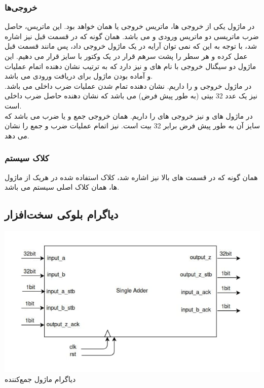 \documentclass[12pt,titlepage,a4page , tikz , multi,table , svgnames,xcdraw]{article}
\begin{document}
\subsubsection{خروجی‌ها}
در ماژول 
 یکی از خروجی ها، ماتریس خروجی یا همان 
 خواهد بود. این ماتریس، حاصل ضرب ماتریسی دو ماتریس ورودی 
 و 
 می باشد. همان گونه که در قسمت قبل نیز اشاره شد، با توجه به این که نمی توان آرایه در یک ماژول خروجی داد، پس مانند قسمت قبل عمل کرده و هر سطر را پشت سرهم قرار در یک وکتور با سایز 
 قرار می دهیم. این ماژول دو سیگنال خروجی با نام های 
  و 
 نیز دارد که به ترتیب نشان دهنده اتمام عملیات و آماده بودن ماژول برای دریافت ورودی می باشد. \\
	در ماژول 
     خروجی 
     و 
      را داریم. 
      نشان دهنده تمام شدن عملیات ضرب داخلی می باشد. 
      نیز یک عدد 32 بیتی (به طور پیش فرض) می باشد که نشان دهنده حاصل ضرب داخلی است. \\ 
	در ماژول های  
     و 
     نیز خروجی های 
     را داریم. 
     همان خروجی جمع و یا ضرب می باشد که سایز آن به طور پیش فرض برابر 32 بیت است. 
     نیز اتمام عملیات ضرب و جمع را نشان می دهد.

\subsubsection{کلاک سیستم}
	همان گونه که در قسمت های بالا نیز اشاره شد، کلاک استفاده شده در هریک از ماژول ها، همان کلاک اصلی سیستم می باشد. 
	





\subsection{دیاگرام بلوکی سخت‌افزار}

\begin{center}
\includegraphics[scale=0.8] {Images/System Architecture/adder.jpg}\\
\caption{دیاگرام ماژول جمع‌کننده}
\end{center} 
\end{document}
